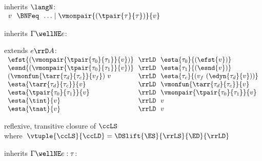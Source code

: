 \begin{flushleft}

\begin{minipage}[t]{\columnwidth}
 inherits $\langN$:\\
$\begin{array}{l@{~~}c@{~~}l}
  v & \BNFeq & \ldots \mid \vmonpair{(\tpair{\tau}{\tau})}{v}
\end{array}$

\medskip
{} inherits $\Gamma \wellNE e$:
\begin{mathpar}
\end{mathpar}

\medskip
{} extends $e \rrD A$:\\
$\begin{array}{l@{~~}c@{~~}l}
  \efst{(\vmonpair{\tpair{\tau_0}{\tau_1}}{v})} & \rrLD & \esta{\tau_0}{(\efst{v})}
\\
  \esnd{(\vmonpair{\tpair{\tau_0}{\tau_1}}{v})} & \rrLD & \esta{\tau_1}{(\esnd{v})}
\\
  (\vmonfun{\tarr{\tau_d}{\tau_c}}{v_f})~v & \rrLD & \esta{\tau_c}{(v_f~(\edyn{\tau_d}{v}))}
\\
  \esta{\tarr{\tau_d}{\tau_c}}{v} & \rrLD & \vmonfun{\tarr{\tau_d}{\tau_c}}{v}
\\
  \esta{\tpair{\tau_0}{\tau_1}}{v} & \rrLD & \vmonpair{\tpair{\tau_0}{\tau_1}}{v}
\\
  \esta{\tint}{v} & \rrLD & v
\\
  \esta{\tnat}{v} & \rrLD & v
\end{array}$

\medskip
{} reflexive, transitive closure of $\ccLS$\\
\mbox{\quad where $\vtuple{\ccLS}{\ccLD} = \DSlift{\ES}{\rrLS}{\ED}{\rrLD}$}
\smallskip
\end{minipage}\hspace{\columnsep}%
\begin{minipage}[t]{\columnwidth}
 inherits $\Gamma \wellNE e : \tau$:
\begin{mathpar}
\end{mathpar}


\end{minipage}
\end{flushleft}
